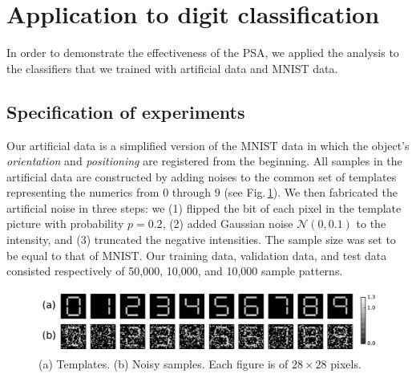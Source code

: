 \section{Application to digit classification}
\label{sec:results}
In order to demonstrate the effectiveness of the PSA,
we applied the analysis to the classifiers that we trained with
artificial data and MNIST data.

\subsection{Specification of experiments}
%
Our artificial data is a simplified version of the MNIST data in which the object's
\textit{orientation} and \textit{positioning} are registered from the beginning.
%
All samples in the artificial data are constructed by adding noises to
the common set of templates representing the numerics
from $0$ through $9$ (see Fig.\,\ref{fig:digit_data}).
%
We then fabricated the artificial noise in three steps:
we
(1) flipped the bit of each pixel in the template picture with probability $p = 0.2$,
(2) added Gaussian noise $\mathcal{N}(0,0.1)$ to the intensity, and
(3) truncated the negative intensities.
%
The sample size was set to be equal to that of MNIST. Our training data,
validation data, and test data consisted respectively of 50,000, 10,000,
and 10,000 sample patterns.
%
\begin{figure}[htbp]
 \centering
 \includegraphics[width=0.8\columnwidth]{./fig/digit_data.pdf}
 \caption{
 (a) Templates. (b) Noisy samples. Each figure is of $28 \times 28$ pixels.
 }
 \label{fig:digit_data}
\end{figure}
%

